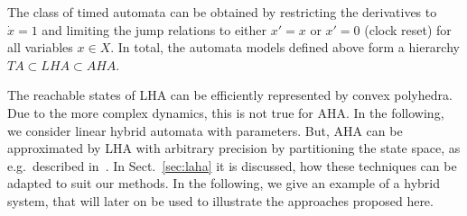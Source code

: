\documentclass{llncs}
\begin{document}
The class of timed automata can be obtained by restricting the
derivatives to $\dot{x} = 1$ and limiting the jump relations to either
$x' = x$ or $x' = 0$ (clock reset) for all variables $x \in X$. In
total, the automata models defined above form a hierarchy $TA \subset
LHA \subset AHA$.

The reachable states of LHA can be efficiently represented by convex
polyhedra. Due to the more complex dynamics, this is not true for
AHA. In the following, we consider linear hybrid automata with
parameters. But, AHA can be approximated by LHA with arbitrary
precision by partitioning the state space, as e.g.~described
in~\cite{Fre:2008}. In Sect.~\ref{sec:laha} it is discussed, how
these techniques can be adapted to suit our methods. In the following,
we give an example of a hybrid system, that will later on be used to
illustrate the approaches proposed here. 



    
\end{document}
